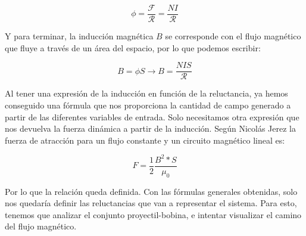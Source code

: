 \begin{center}
    \[\phi=\frac{\mathcal{F}}{\mathcal{R}}=\frac{NI}{\mathcal{R}}\]
\end{center}

Y para terminar, la inducción magnética \(B\) se corresponde con el flujo magnético que fluye a través de un área del espacio, por lo que podemos escribir:

\begin{center}
    \[B=\phi S\to B=\frac{NIS}{\mathcal{R}}\]
\end{center}

Al tener una expresión de la inducción en función de la reluctancia, ya hemos conseguido una fórmula que nos proporciona la cantidad de campo generado a partir de las diferentes variables de entrada. Solo necesitamos otra expresión que nos devuelva la fuerza dinámica a partir de la inducción. Según Nicolás Jerez \citep{jerez2016resueltos} la fuerza de atracción para un flujo constante y un circuito magnético lineal es:
\begin{center}
\[F=\frac{1}{2}\frac{B^2*S}{\mu_0}\]
\end{center}

Por lo que la relación queda definida. Con las fórmulas generales obtenidas, solo nos quedaría definir las reluctancias que van a representar el sistema. Para esto, tenemos que analizar el conjunto proyectil-bobina, e intentar visualizar el camino del flujo magnético.